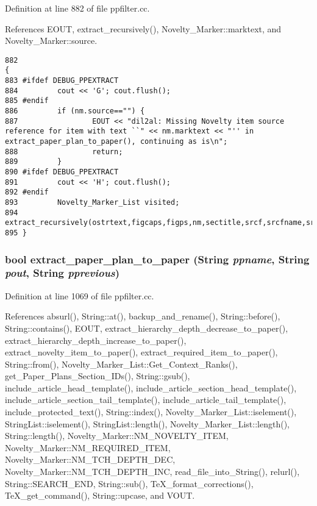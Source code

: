 Definition at line 882 of file ppfilter.cc.

References EOUT, extract\_\-recursively(), Novelty\_\-Marker::marktext, and Novelty\_\-Marker::source.



\footnotesize\begin{verbatim}882                                                                                                                                                                                                                                 {
883 #ifdef DEBUG_PPEXTRACT
884         cout << 'G'; cout.flush();
885 #endif
886         if (nm.source=="") {
887                 EOUT << "dil2al: Missing Novelty item source reference for item with text ``" << nm.marktext << "'' in extract_paper_plan_to_paper(), continuing as is\n";
888                 return;
889         }
890 #ifdef DEBUG_PPEXTRACT
891         cout << 'H'; cout.flush();
892 #endif
893         Novelty_Marker_List visited;
894         extract_recursively(ostrtext,figcaps,figps,nm,sectitle,srcf,srcfname,srcfnum,0,visited,poutline,pprevtext);
895 }
\end{verbatim}\normalsize 
{}
\subsubsection{\setlength{\rightskip}{0pt plus 5cm}bool extract\_\-paper\_\-plan\_\-to\_\-paper ({\bf String} {\em ppname}, {\bf String} {\em pout}, {\bf String} {\em pprevious})}\label{ppfilter_8cc_a28}




Definition at line 1069 of file ppfilter.cc.

References absurl(), String::at(), backup\_\-and\_\-rename(), String::before(), String::contains(), EOUT, extract\_\-hierarchy\_\-depth\_\-decrease\_\-to\_\-paper(), extract\_\-hierarchy\_\-depth\_\-increase\_\-to\_\-paper(), extract\_\-novelty\_\-item\_\-to\_\-paper(), extract\_\-required\_\-item\_\-to\_\-paper(), String::from(), Novelty\_\-Marker\_\-List::Get\_\-Context\_\-Ranks(), get\_\-Paper\_\-Plans\_\-Section\_\-IDs(), String::gsub(), include\_\-article\_\-head\_\-template(), include\_\-article\_\-section\_\-head\_\-template(), include\_\-article\_\-section\_\-tail\_\-template(), include\_\-article\_\-tail\_\-template(), include\_\-protected\_\-text(), String::index(), Novelty\_\-Marker\_\-List::iselement(), String\-List::iselement(), String\-List::length(), Novelty\_\-Marker\_\-List::length(), String::length(), Novelty\_\-Marker::NM\_\-NOVELTY\_\-ITEM, Novelty\_\-Marker::NM\_\-REQUIRED\_\-ITEM, Novelty\_\-Marker::NM\_\-TCH\_\-DEPTH\_\-DEC, Novelty\_\-Marker::NM\_\-TCH\_\-DEPTH\_\-INC, read\_\-file\_\-into\_\-String(), relurl(), String::SEARCH\_\-END, String::sub(), Te\-X\_\-format\_\-corrections(), Te\-X\_\-get\_\-command(), String::upcase, and VOUT.



